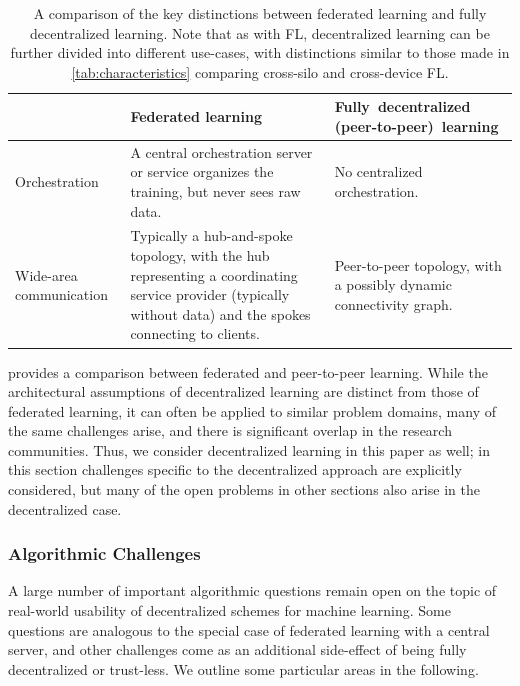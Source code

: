 \documentclass[11pt]{article}
\begin{document}
\begin{table}
\begin{centering}
\renewcommand{\arraystretch}{1.5}
\begin{tabularx}{\textwidth}{lXX}
\toprule
       & \textbf{Federated learning} & \textbf{\mbox{Fully~decentralized} \mbox{(peer-to-peer) learning}} \\
\midrule 
Orchestration 
  & A central orchestration server or service organizes the training, but never sees raw data.
  & No centralized orchestration. \\
Wide-area communication 
  & Typically a hub-and-spoke topology, with the hub representing a coordinating service provider (typically without data) and the spokes connecting to clients. 
  & Peer-to-peer topology, with a possibly dynamic connectivity graph. \\
\bottomrule
\end{tabularx}
\caption{A comparison of the key distinctions between federated learning and fully decentralized learning. Note that as with FL, decentralized learning can be further divided into different use-cases, with distinctions similar to those made in \cref{tab:characteristics} comparing cross-silo and cross-device FL.}
\label{tab:decentralized}
\end{centering}
\end{table}

 provides a comparison between federated and peer-to-peer learning. While the architectural assumptions of decentralized learning are distinct from those of federated learning, it can often be applied to similar problem domains, many of the same challenges arise, and there is significant overlap in the research communities. Thus, we consider decentralized learning in this paper as well; in this section challenges specific to the decentralized approach are explicitly considered, but many of the open problems in other sections also arise in the decentralized case.


\subsubsection{Algorithmic Challenges}
A large number of important algorithmic questions remain open on the topic of real-world usability of decentralized schemes for machine learning. Some questions are analogous to the special case of federated learning with a central server, and other challenges come as an additional side-effect of being fully decentralized or trust-less. We outline some particular areas in the following.
\end{document}
